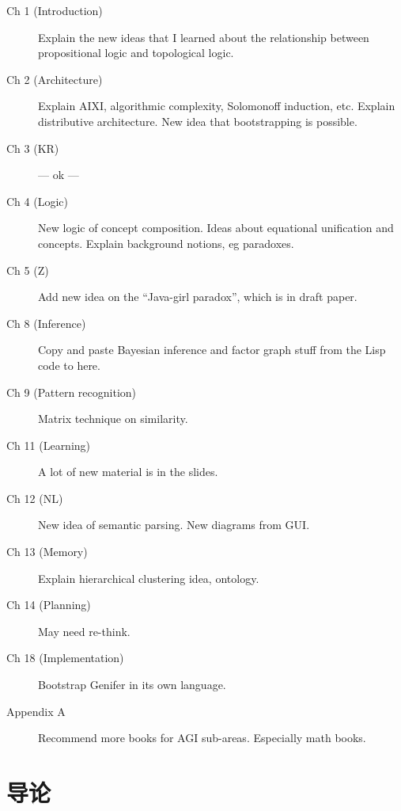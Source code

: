 \documentclass[12pt, a4paper]{report}
\newcommand{\cc}[2]{#1}
\newcommand{\cc}[2]{#2}
\theoremstyle{examples} \newtheorem{example}{Example}[section]
\begin{document}
\begin{description}

\item[Ch 1 (Introduction)]  Explain the new ideas that I learned about the relationship between propositional logic and topological logic.

\item[Ch 2 (Architecture)]  Explain AIXI, algorithmic complexity, Solomonoff induction, etc.  Explain distributive architecture.  New idea that bootstrapping is possible.

\item[Ch 3 (KR)] --- ok ---

\item[Ch 4 (Logic)]  New logic of concept composition.  Ideas about equational unification and concepts.  Explain background notions, eg paradoxes.

\item[Ch 5 (Z)]  Add new idea on the ``Java-girl paradox'', which is in draft paper.

\item[Ch 8 (Inference)]  Copy and paste Bayesian inference and factor graph stuff from the Lisp code to here.

\item[Ch 9 (Pattern recognition)]  Matrix technique on similarity.

\item[Ch 11 (Learning)]  A lot of new material is in the slides.

\item[Ch 12 (NL)] New idea of semantic parsing.  New diagrams from GUI.

\item[Ch 13 (Memory)]  Explain hierarchical clustering idea, ontology.

\item[Ch 14 (Planning)]  May need re-think.

\item[Ch 18 (Implementation)]  Bootstrap Genifer in its own language.

\item[Appendix A]  Recommend more books for AGI sub-areas.  Especially math books.

\end{description}

\color{black}

\tableofcontents

\setcounter{chapter}{-1}
\chapter{\cc{导论}{Introduction}}
\end{document}
